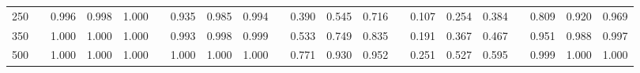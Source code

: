 % 
\begin{tabular}{ccccccccccccccccccccc}
  \hline
  \hline
250 &  & 0.996 & 0.998 & 1.000 &  & 0.935 & 0.985 & 0.994 &  & 0.390 & 0.545 & 0.716 &  & 0.107 & 0.254 & 0.384 &  & 0.809 & 0.920 & 0.969 \\ 
  350 &  & 1.000 & 1.000 & 1.000 &  & 0.993 & 0.998 & 0.999 &  & 0.533 & 0.749 & 0.835 &  & 0.191 & 0.367 & 0.467 &  & 0.951 & 0.988 & 0.997 \\ 
  500 &  & 1.000 & 1.000 & 1.000 &  & 1.000 & 1.000 & 1.000 &  & 0.771 & 0.930 & 0.952 &  & 0.251 & 0.527 & 0.595 &  & 0.999 & 1.000 & 1.000 \\ 
   \hline
\end{tabular}
